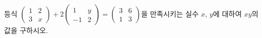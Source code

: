 \hspace*{2mm}\begin{minipage}[t]{\dimexpr\linewidth-2mm\relax}\vspace{0pt}
등식 $\begin{pmatrix} 1 & 2 \\ 3 & x \end{pmatrix}+2\begin{pmatrix} 1 & y \\ -1 & 2 \end{pmatrix}=\begin{pmatrix} 3 & 6 \\ 1 & 3 \end{pmatrix}$을 만족시키는 실수 $x$, $y$에 대하여 $xy$의 값을 구하시오.\end{minipage}

